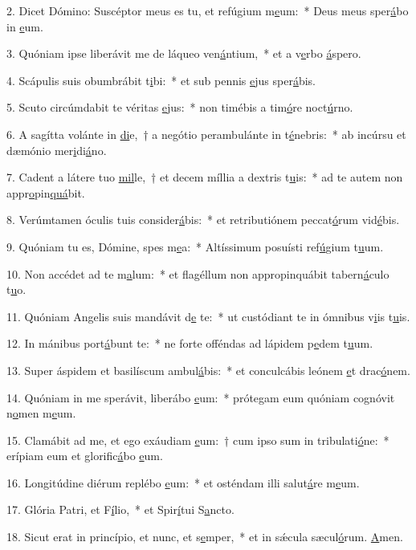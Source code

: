 2. Dicet Dómino: Suscéptor meus es tu, et refúgium m\uline{e}um:~* Deus meus sper\uline{á}bo in \uline{e}um.\par 
3. Quóniam ipse liberávit me de láqueo ven\uline{á}ntium,~* et a v\uline{e}rbo \uline{á}spero.\par 
4. Scápulis suis obumbrábit t\uline{i}bi:~* et sub pennis \uline{e}jus sper\uline{á}bis.\par 
5. Scuto circúmdabit te véritas \uline{e}jus:~* non timébis a tim\uline{ó}re noct\uline{ú}rno.\par 
6. A sagítta volánte in \uline{di}e,~† a negótio perambulánte in t\uline{é}nebris:~* ab incúrsu et dæmónio mer\uline{i}di\uline{á}no.\par 
7. Cadent a látere tuo \uline{mil}le,~† et decem míllia a dextris t\uline{u}is:~* ad te autem non appr\uline{o}pin\uline{quá}bit.\par 
8. Verúmtamen óculis tuis consider\uline{á}bis:~* et retributiónem peccat\uline{ó}rum vid\uline{é}bis.\par 
9. Quóniam tu es, Dómine, spes m\uline{e}a:~* Altíssimum posuísti ref\uline{ú}gium t\uline{u}um.\par 
10. Non accédet ad te m\uline{a}lum:~* et flagéllum non appropinquábit tabern\uline{á}culo t\uline{u}o.\par 
11. Quóniam Angelis suis mandávit d\uline{e} te:~* ut custódiant te in ómnibus v\uline{i}is t\uline{u}is.\par 
12. In mánibus port\uline{á}bunt te:~* ne forte offéndas ad lápidem p\uline{e}dem t\uline{u}um.\par 
13. Super áspidem et basilíscum ambul\uline{á}bis:~* et conculcábis leónem \uline{e}t drac\uline{ó}nem.\par 
14. Quóniam in me sperávit, liberábo \uline{e}um:~* prótegam eum quóniam cognóvit n\uline{o}men m\uline{e}um.\par 
15. Clamábit ad me, et ego exáudiam \uline{e}um:~† cum ipso sum in tribulati\uline{ó}ne:~* erípiam eum et glorific\uline{á}bo \uline{e}um.\par 
16. Longitúdine diérum replébo \uline{e}um:~* et osténdam illi salut\uline{á}re m\uline{e}um.\par 
17. Glória Patri, et F\uline{í}lio,~* et Spir\uline{í}tui S\uline{a}ncto.\par 
18. Sicut erat in princípio, et nunc, et s\uline{e}mper,~* et in sǽcula sæcul\uline{ó}rum. \uline{A}men.\par 
